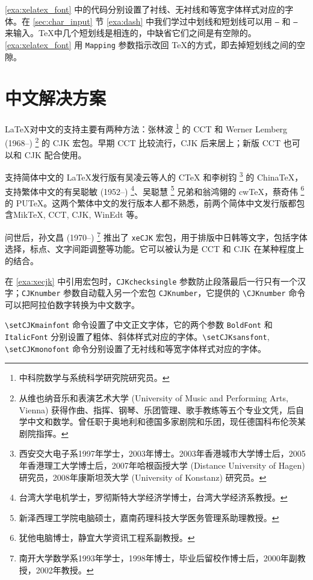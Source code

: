 \autoref{exa:xelatex_font} 中的代码分别设置了衬线、无衬线和等宽字体样式对应的字体。在 \ref{sec:char_input} 节 \autoref{exa:dash} 中我们学过中划线和短划线可以用 \texttt{--} 和 \texttt{---} 来输入。\TeX 中几个短划线是相连的，\XeTeX 中缺省它们之间是有空隙的。\autoref{exa:xelatex_font} 用 \texttt{Mapping} 参数指示改回 \TeX 的方式，即去掉短划线之间的空隙。

\section{中文解决方案}

\LaTeX 对中文的支持主要有两种方法：张林波\indexZhangLinbo{} \footnote{中科院数学与系统科学研究院研究员。} 的 CCT 和 Werner Lemberg (1968--)\indexLemberg{} \footnote{从维也纳音乐和表演艺术大学 (University of Music and Performing Arts, Vienna) 获得作曲、指挥、钢琴、乐团管理、歌手教练等五个专业文凭，后自学中文和数学。曾任职于奥地利和德国多家剧院和乐团，现任德国科布伦茨某剧院指挥。} 的 CJK 宏包。早期 CCT 比较流行，CJK 后来居上；新版 CCT 也可以和 CJK 配合使用。

支持简体中文的 \LaTeX 发行版有吴凌云等人的 CTeX 和李树钧\indexLiShujun{} \footnote{西安交大电子系1997年学士，2003年博士。2003年香港城市大学博士后，2005年香港理工大学博士后，2007年哈根函授大学 (Distance University of Hagen) 研究员，2008年康斯坦茨大学 (University of Konstanz) 研究员。} 的 ChinaTeX，支持繁体中文的有吴聪敏 (1952--)\indexWuCongmin{} \footnote{台湾大学电机学士，罗彻斯特大学经济学博士，台湾大学经济系教授。}、吴聪慧\indexWuConghui{} \footnote{新泽西理工学院电脑硕士，嘉南药理科技大学医务管理系助理教授。} 兄弟和翁鸿翎\indexWongHongling 的 cwTeX，蔡奇伟\indexCaiQiwei{} \footnote{犹他电脑博士，静宜大学资讯工程系副教授。} 的 PUTeX。这两个繁体中文的发行版本人都不熟悉，前两个简体中文发行版都包含MikTeX, CCT, CJK, WinEdt 等。

\XeTeX 问世后，孙文昌 (1970--)\indexSunWenchang{} \footnote{南开大学数学系1993年学士，1998年博士，毕业后留校作博士后，2000年副教授，2002年教授。} 推出了 \texttt{xeCJK} 宏包，用于排版中日韩等文字，包括字体选择，标点、文字间距调整等功能。它可以被认为是 CCT 和 CJK 在某种程度上的结合。

在 \autoref{exa:xecjk} 中引用宏包时，\texttt{CJKchecksingle} 参数防止段落最后一行只有一个汉字；\texttt{CJKnumber} 参数自动载入另一个宏包 \texttt{CJKnumber}，它提供的 \verb|\CJKnumber| 命令可以把阿拉伯数字转换为中文数字。

\verb|\setCJKmainfont| 命令设置了中文正文字体，它的两个参数 \texttt{BoldFont} 和 \texttt{ItalicFont} 分别设置了粗体、斜体样式对应的字体。\verb|\setCJKsansfont|, \verb|\setCJKmonofont| 命令分别设置了无衬线和等宽字体样式对应的字体。

